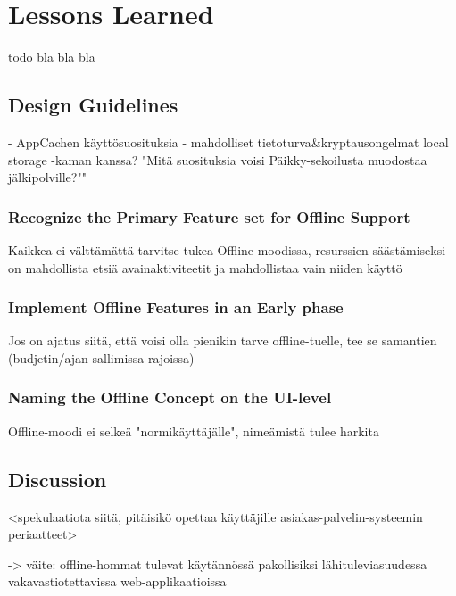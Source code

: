 \chapter{Lessons Learned}
todo bla bla bla



\section{Design Guidelines}
- AppCachen käyttösuosituksia
- mahdolliset tietoturva&kryptausongelmat local storage -kaman kanssa?
"Mitä suosituksia voisi Päikky-sekoilusta muodostaa jälkipolville?""

\subsection{Recognize the Primary Feature set for Offline Support}
Kaikkea ei välttämättä tarvitse tukea Offline-moodissa, resurssien säästämiseksi on mahdollista etsiä avainaktiviteetit ja mahdollistaa vain niiden käyttö


\subsection{Implement Offline Features in an Early phase}
Jos on ajatus siitä, että voisi olla pienikin tarve offline-tuelle, tee se samantien (budjetin/ajan sallimissa rajoissa)

\subsection{Naming the Offline Concept on the UI-level}
Offline-moodi ei selkeä "normikäyttäjälle", nimeämistä tulee harkita



\section{Discussion}

<spekulaatiota siitä, pitäisikö opettaa käyttäjille asiakas-palvelin-systeemin periaatteet>


-> väite: offline-hommat tulevat käytännössä pakollisiksi lähituleviasuudessa vakavastiotettavissa web-applikaatioissa









